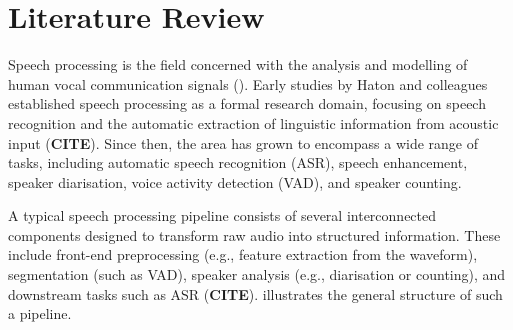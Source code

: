 






\chapter{Literature Review}

Speech processing is the field concerned with the analysis and modelling of human vocal communication signals (). Early studies by Haton and colleagues established speech processing as a formal research domain, focusing on speech recognition and the automatic extraction of linguistic information from acoustic input (\textbf{CITE}). Since then, the area has grown to encompass a wide range of tasks, including automatic speech recognition (ASR), speech enhancement, speaker diarisation, voice activity detection (VAD), and speaker counting.

A typical speech processing pipeline consists of several interconnected components designed to transform raw audio into structured information. These include front-end preprocessing (e.g., feature extraction from the waveform), segmentation (such as VAD), speaker analysis (e.g., diarisation or counting), and downstream tasks such as ASR (\textbf{CITE}).  illustrates the general structure of such a pipeline.

